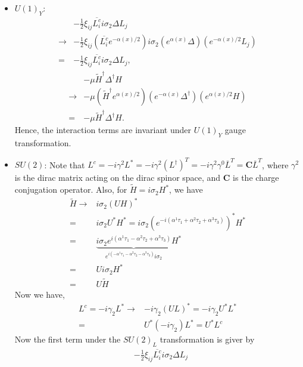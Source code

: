 \begin{itemize}
    \item $U(1)_Y$:
        \begin{align}
        &-\frac{1}{2}\xi_{ij} \overline{L_i^c} i\sigma_2 \Delta L_j\\
        \to& -\frac{1}{2}\xi_{ij} (\overline{L_i^c} e^{-\alpha(x)/2} )i\sigma_2 ( e^{\alpha(x)}  \Delta )(e^{-\alpha(x)/2}  L_j)\\
        =&-\frac{1}{2}\xi_{ij} \overline{L_i^c} i\sigma_2 \Delta L_j,
        \end{align}
        \begin{align}
            &-\mu \tilde{H}^\dagger\Delta^\dagger H \\
            \to& -\mu (\tilde{H}^\dagger e^{\alpha(x)/2}) (e^{-\alpha(x)} \Delta^\dagger)  (e^{\alpha(x)/2} H)\\
            =&-\mu \tilde{H}^\dagger\Delta^\dagger H.
        \end{align}
        Hence, the interaction terms are invariant under $U(1)_Y$ gauge transformation. 
    \item $SU(2)$:
    Note that $L^c= -i\gamma^2 L^*=-i\gamma^2 (L^\dagger)^T=-i\gamma^2\gamma^0 \overline{L}^T=\mathbf{C}\overline{L}^T$, where $\gamma^2$ is the dirac matrix acting on the dirac spinor space, and $\mathbf{C}$ is the charge conjugation operator. Also, for $\tilde{H}=i\sigma_2H^*$, we have 
    \begin{align}
        \tilde{H}\to& i\sigma_2 (UH)^*\\
        =& i\sigma_2 U^* H^* = i\sigma_2 \left(e^{-i (\alpha^1\tau_1+\alpha^2\tau_2+\alpha^3\tau_3)}\right)^* H^*\\
        =& \underbrace{i\sigma_2 e^{i (\alpha^1\tau_1 - \alpha^2\tau_2+\alpha^3\tau_3)}}_{e^{i (-\alpha^1\tau_1 - \alpha^2\tau_2-\alpha^3\tau_3)}i\sigma_2} H^*\\
        =& Ui\sigma_2 H^*\\
        =& U \tilde{H}
    \end{align}
    Now we have, 
    \begin{align}
        L^c= -i\gamma_2 L^*\to& -i\gamma_2 (UL)^* =-i\gamma_2 U^* L^* \\
        =& U^* (-i\gamma_2) L^*=U^* L^c
    \end{align}
    Now the first term under the $SU(2)_L$ transformation is giver by
    \begin{align}
        &-\frac{1}{2}\xi_{ij} \overline{L_i^c} i\sigma_2 \Delta L_j\\

\end{align}
\end{itemize}
